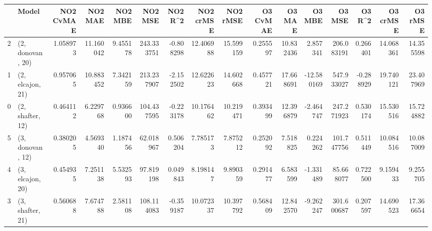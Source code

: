\begin{tabular}{llrrrrrrrrrrrrrr}
\toprule
{} &             Model &  NO2 CvMAE &    NO2 MAE &   NO2 MBE &     NO2 MSE &   NO2 R\textasciicircum2 &  NO2 crMSE &   NO2 rMSE &  O3 CvMAE &     O3 MAE &     O3 MBE &      O3 MSE &    O3 R\textasciicircum2 &   O3 crMSE &    O3 rMSE \\
\midrule
2 &  (2, donovan, 20) &   1.058973 &  11.160042 &  9.455178 &  243.333751 & -0.808298 &  12.406988 &  15.599159 &  0.255597 &  10.832436 &   2.857341 &  206.083191 &  0.266401 &  14.068361 &  14.355598 \\
1 &  (2, elcajon, 21) &   0.957065 &  10.883452 &  7.342159 &  213.237907 & -2.152502 &  12.622623 &  14.602668 &  0.457721 &  17.668691 & -12.580169 &  547.933027 & -0.288929 &  19.740121 &  23.407969 \\
0 &  (2, shafter, 12) &   0.464112 &   6.229768 &  0.936600 &  104.437595 & -0.223178 &  10.176462 &  10.219471 &  0.393499 &  12.396879 &  -2.464747 &  247.271923 &  0.530174 &  15.530516 &  15.724882 \\
5 &  (3, donovan, 12) &   0.380205 &   4.569340 &  1.187456 &   62.018967 &  0.506204 &   7.785173 &   7.875212 &  0.252092 &   7.518825 &   0.224262 &  101.747756 &  0.511449 &  10.084516 &  10.087009 \\
4 &  (3, elcajon, 20) &   0.454935 &   7.251138 &  5.532593 &   97.819198 &  0.049843 &   8.198147 &   9.890359 &  0.291477 &   6.583599 &  -1.331489 &   85.668077 &  0.722500 &   9.159433 &   9.255705 \\
3 &  (3, shafter, 21) &   0.560688 &   7.674788 &  2.581108 &  108.114083 & -0.359187 &  10.072337 &  10.397792 &  0.568409 &  12.842570 &  -9.262247 &  301.600687 &  0.207597 &  14.690523 &  17.366654 \\
\bottomrule
\end{tabular}

